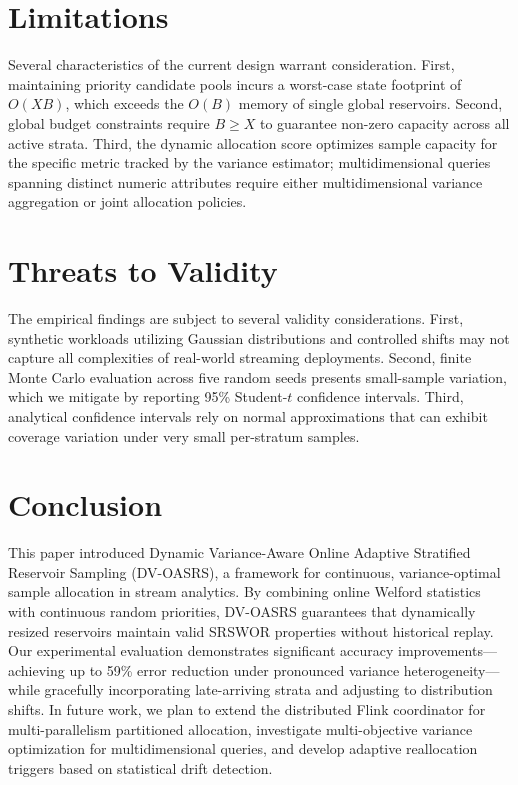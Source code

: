 \documentclass[conference]{IEEEtran}
\begin{document}
\section{Limitations}

Several characteristics of the current design warrant consideration. First, maintaining priority candidate pools incurs a worst-case state footprint of $O(XB)$, which exceeds the $O(B)$ memory of single global reservoirs. Second, global budget constraints require $B \ge X$ to guarantee non-zero capacity across all active strata. Third, the dynamic allocation score optimizes sample capacity for the specific metric tracked by the variance estimator; multidimensional queries spanning distinct numeric attributes require either multidimensional variance aggregation or joint allocation policies.


\section{Threats to Validity}

The empirical findings are subject to several validity considerations. First, synthetic workloads utilizing Gaussian distributions and controlled shifts may not capture all complexities of real-world streaming deployments. Second, finite Monte Carlo evaluation across five random seeds presents small-sample variation, which we mitigate by reporting 95\% Student-$t$ confidence intervals. Third, analytical confidence intervals rely on normal approximations that can exhibit coverage variation under very small per-stratum samples.


\section{Conclusion}

This paper introduced Dynamic Variance-Aware Online Adaptive Stratified Reservoir Sampling (DV-OASRS), a framework for continuous, variance-optimal sample allocation in stream analytics. By combining online Welford statistics with continuous random priorities, DV-OASRS guarantees that dynamically resized reservoirs maintain valid SRSWOR properties without historical replay. Our experimental evaluation demonstrates significant accuracy improvements—achieving up to 59\% error reduction under pronounced variance heterogeneity—while gracefully incorporating late-arriving strata and adjusting to distribution shifts. In future work, we plan to extend the distributed Flink coordinator for multi-parallelism partitioned allocation, investigate multi-objective variance optimization for multidimensional queries, and develop adaptive reallocation triggers based on statistical drift detection.
\end{document}

